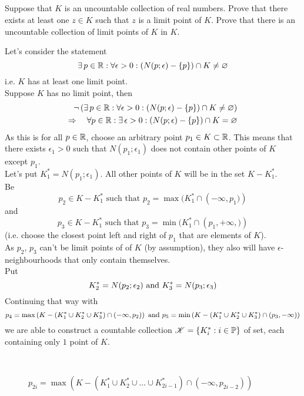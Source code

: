 \subsection{}
\begin{tcolorbox}
Suppose that $K$ is an uncountable collection of real numbers.
Prove that there exists at least one $z \in K$ such that $z$ is a limit point of $K$. Prove that there is an uncountable collection of limit points of $K$ in $K$.
\end{tcolorbox}
Let's consider the statement 
$$\exists\, p\in\mathbb{R}:\forall\epsilon>0:\left(N(p;\epsilon)-\{p\}\right)\cap K\neq\varnothing$$
i.e. $K$ has at least one limit point.\\
Suppose $K$ has no limit point, then 
\begin{align*}
\neg\left(  \exists\, p\in\mathbb{R}:\forall\epsilon>0:\left(N(p;\epsilon)-\{p\}\right)\cap K\neq\varnothing\right)\\
\Rightarrow\quad \forall  p\in\mathbb{R}:\exists\,\epsilon>0:\left(N(p;\epsilon)-\{p\}\right)\cap K=\varnothing
\end{align*}
As this is for all $p\in\mathbb{R}$, choose an arbitrary point $p_1\in K\subset \mathbb{R}$. This means that there exists $\epsilon_1>0$ such that $N(p_1;\epsilon_1)$ does not contain other points of $K$ except $p_1$.\\
Let's put $K^*_1=N(p_1;\epsilon_1)$. All other points of $K$ will be in the set $K-K^*_1$.\\
Be 
$$p_2\in K-K^*_1 \text{ such that } p_2=\max(K^*_1\cap \left(-\infty, p_1)\right)$$
and 
$$p_3\in K-K^*_1\text{ such that }p_3=\min(K^*_1\cap \left(p_1,+\infty, )\right)$$
(i.e. choose the closest point left and right of $p_1$ that are elements of $K$).\\
As $p_2,\, p_3$ can't be limit points of of $K$ (by assumption), they also will have $\epsilon$-neighbourhoods that only contain themselves.\\
Put $$K^*_2=N(p_2;\epsilon_2)\text{ and } K^*_3=N(p_3;\epsilon_3)$$
Continuing that way with 
$$p_4=\max\left( K-\left(K^*_1\cup K^*_2\cup K^*_3\right)\cap(-\infty,p_2)\right) \text{ and } p_5=\min\left( K-\left(K^*_1\cup K^*_2\cup K^*_3\right)\cap(p_3,-\infty)\right)$$
we are able to construct a countable collection $\mathscr{K}=\{K^*_i:i\in\mathbb{P}\}$ of set, each containing only $1$ point of $K$. 
 \begin{figure}[H]%
    \centering
\\
\caption{$p_{2i}=\max\left( K-\left(K^*_1\cup K^*_2\cup \dots \cup K^*_{2i-1}\right)\cap(-\infty,p_{2i-2})\right) $}
\label{fig:fig_p8a}
\end{figure}

